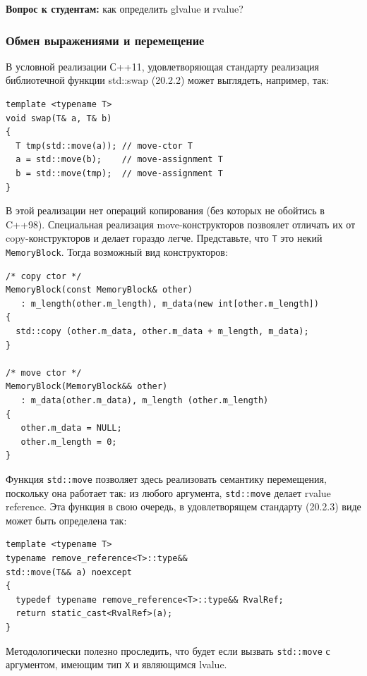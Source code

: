 \documentclass[a4paper,12pt,oneside]{article}
\newif\ifanswers
\begin{document}
\textbf{Вопрос к студентам:} как определить glvalue и rvalue?

\ifanswers
Правильный ответ: glvalue это lvalue or xvalue и дальше побитовыми операциями
\fi

\subsubsection{Обмен выражениями и перемещение}

В условной реализации С++11, удовлетворяющая стандарту реализация библиотечной функции std::swap (20.2.2) может выглядеть, например, так:

\begin{lstlisting}
template <typename T> 
void swap(T& a, T& b) 
{ 
  T tmp(std::move(a)); // move-ctor T
  a = std::move(b);    // move-assignment T
  b = std::move(tmp);  // move-assignment T
} 
\end{lstlisting}

В этой реализации нет операций копирования (без которых не обойтись в C++98). Специальная реализация move-конструкторов позвоялет отличать их от copy-конструкторов и делает гораздо легче. Представьте, что \lstinline!T! это некий \lstinline!MemoryBlock!. Тогда возможный вид конструкторов:

\begin{lstlisting}
/* copy ctor */
MemoryBlock(const MemoryBlock& other)
   : m_length(other.m_length), m_data(new int[other.m_length])
{
  std::copy (other.m_data, other.m_data + m_length, m_data);
}

/* move ctor */
MemoryBlock(MemoryBlock&& other) 
   : m_data(other.m_data), m_length (other.m_length)
{
   other.m_data = NULL;
   other.m_length = 0;
}
\end{lstlisting}

Функция \lstinline!std::move! позволяет здесь реализовать семантику перемещения, поскольку она работает так: из любого аргумента, \lstinline!std::move! делает rvalue reference. Эта функция в свою очередь, в удовлетворящем стандарту (20.2.3) виде может быть определена так:

\begin{lstlisting}
template <typename T> 
typename remove_reference<T>::type&&
std::move(T&& a) noexcept
{
  typedef typename remove_reference<T>::type&& RvalRef;
  return static_cast<RvalRef>(a);
} 
\end{lstlisting}

Методологически полезно проследить, что будет если вызвать \lstinline!std::move! с аргументом, имеющим тип \lstinline!X! и являющимся lvalue.
\end{document}

